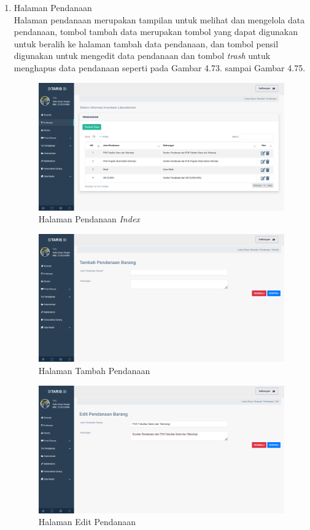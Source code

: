 \begin{enumerate}
  \item Halaman Pendanaan \\ Halaman pendanaan merupakan tampilan untuk melihat dan mengelola data pendanaan, tombol tambah data merupakan tombol yang dapat digunakan untuk beralih ke halaman tambah data pendanaan, dan tombol pensil digunakan untuk mengedit data pendanaan dan tombol \textit{trash} untuk menghapus data pendanaan seperti pada Gambar 4.73. sampai Gambar 4.75.

        \begin{figure}
          \centering
          \includegraphics[width=0.82\linewidth]{konten//gambar/pendanaan.png}
          \caption{Halaman Pendanaan \textit{Index}}
          \label{fig:enter-label}
        \end{figure}

        \begin{figure}
          \centering
          \includegraphics[width=0.82\linewidth]{konten//gambar/pendanaan tambah.png}
          \caption{Halaman Tambah Pendanaan}
          \label{fig:enter-label}
        \end{figure}

        \begin{figure}
          \centering
          \includegraphics[width=0.82\linewidth]{konten//gambar/pendanaan edit.png}
          \caption{Halaman Edit Pendanaan}
          \label{fig:enter-label}
        \end{figure}


\end{enumerate}
